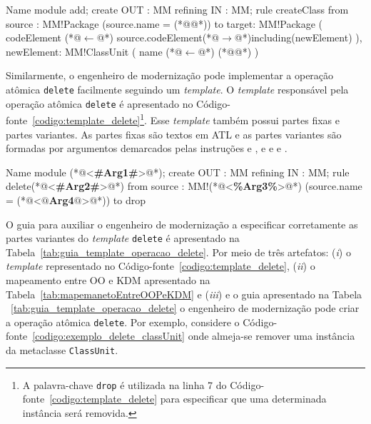 \begin{codigo}[caption={[ATL para realizar a operação atômica \texttt{add} \texttt{ClassUnit}.] ATL para realizar a operação atômica \texttt{add} \texttt{ClassUnit}.},escapeinside={(*@}{@*)}, basicstyle=\footnotesize, label={codigo:exemplo_add_classUnit}, language=ATL]{Name}
module add;
create OUT : MM refining IN : MM;
rule createClass{
	from
		source : MM!Package (source.name = (*@@*))
	to 
		target: MM!Package (
			codeElement (*@$\leftarrow$@*) source.codeElement(*@$\rightarrow$@*)including(newElement)
		),
		newElement: MM!ClassUnit (
			name (*@$\leftarrow$@*) (*@@*)
		)
}
\end{codigo}


Similarmente, o engenheiro de modernização pode implementar a operação atômica \texttt{delete} facilmente seguindo um \textit{template}. O \textit{template} responsável pela operação atômica \texttt{delete} é apresentado no Código-fonte~\ref{codigo:template_delete}\footnote{A palavra-chave \texttt{drop} é utilizada na linha 7 do Código-fonte~\ref{codigo:template_delete} para especificar que uma determinada instância será removida.}. Esse \textit{template} também possui partes fixas e partes variantes. As partes fixas são textos em ATL e as partes variantes são formadas por argumentos demarcados pelas instruções \aspas{\textbf{<\#}} e \aspas{\textbf{\#>}}, \aspas{\textbf{<\%}} e \aspas{\textbf{\%>}} e  e . 
\begin{codigo}[caption={[\textit{Template} ATL para realizar a operação atômica \texttt{delete}.] \textit{Template} ATL para realizar a operação atômica \texttt{delete}.},escapeinside={(*@}{@*)}, basicstyle=\footnotesize, label={codigo:template_delete}, language=ATL]{Name}
module (*@<\textbf{\#Arg1\#}>@*);
create OUT : MM refining IN : MM;
rule delete(*@<\textbf{\#Arg2\#}>@*) {
  from
      source : MM!(*@<\textbf{\%Arg3\%}>@*) (source.name = (*@<\textbf{$@$Arg4$@$}>@*))
  to
      drop
}
\end{codigo}

O guia para auxiliar o engenheiro de modernização a especificar corretamente as partes variantes do \textit{template} \texttt{delete} é apresentado na Tabela~\ref{tab:guia_template_operacao_delete}. Por meio de três artefatos: (\textit{i}) o \textit{template} representado no Código-fonte~\ref{codigo:template_delete}, (\textit{ii}) o mapeamento entre OO e KDM apresentado na Tabela~\ref{tab:mapemanetoEntreOOPeKDM} e (\textit{iii}) e o guia apresentado na Tabela ~\ref{tab:guia_template_operacao_delete} o engenheiro de modernização pode criar a operação atômica \texttt{delete}. Por exemplo, considere o Código-fonte~\ref{codigo:exemplo_delete_classUnit} onde almeja-se remover uma instância da metaclasse \texttt{ClassUnit}. 


